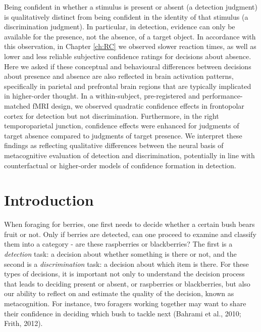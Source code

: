 \documentclass[12pt,twoside]{reedthesis}
\begin{document}
Being confident in whether a stimulus is present or absent (a detection judgment) is qualitatively distinct from being confident in the identity of that stimulus (a discrimination judgment). In particular, in detection, evidence can only be available for the presence, not the absence, of a target object. In accordance with this observation, in Chapter \ref{ch:RC} we observed slower reaction times, as well as lower and less reliable subjective confidence ratings for decisions about absence. Here we asked if these conceptual and behavioural differences between decisions about presence and absence are also reflected in brain activation patterns, specifically in parietal and prefrontal brain regions that are typically implicated in higher-order thought. In a within-subject, pre-registered and performance-matched fMRI design, we observed quadratic confidence effects in frontopolar cortex for detection but not discrimination. Furthermore, in the right temporoparietal junction, confidence effects were enhanced for judgments of target absence compared to judgments of target presence. We interpret these findings as reflecting qualitative differences between the neural basis of metacognitive evaluation of detection and discrimination, potentially in line with counterfactual or higher-order models of confidence formation in detection.

\hypertarget{introduction-4}{%
\section{Introduction}\label{introduction-4}}

When foraging for berries, one first needs to decide whether a certain bush bears fruit or not. Only if berries are detected, can one proceed to examine and classify them into a category - are these raspberries or blackberries? The first is a \emph{detection} task: a decision about whether something is there or not, and the second is a \emph{discrimination} task: a decision about which item is there. For these types of decisions, it is important not only to understand the decision process that leads to deciding present or absent, or raspberries or blackberries, but also our ability to reflect on and estimate the quality of the decision, known as metacognition. For instance, two foragers working together may want to share their confidence in deciding which bush to tackle next (Bahrami et al., 2010; Frith, 2012).
\end{document}
